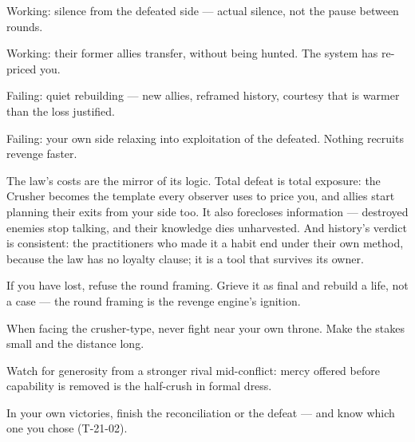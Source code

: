 \begin{feedback}
  \item Working: silence from the defeated side --- actual silence, not the pause between rounds.
  \item Working: their former allies transfer, without being hunted. The system has re-priced you.
  \item Failing: quiet rebuilding --- new allies, reframed history, courtesy that is warmer than the loss justified.
  \item Failing: your own side relaxing into exploitation of the defeated. Nothing recruits revenge faster.
\end{feedback}
\begin{failure}
The law's costs are the mirror of its logic. Total defeat is total exposure: the Crusher becomes the template every observer uses to price you, and allies start planning their exits from your side too. It also forecloses information --- destroyed enemies stop talking, and their knowledge dies unharvested. And history's verdict is consistent: the practitioners who made it a habit end under their own method, because the law has no loyalty clause; it is a tool that survives its owner.
\end{failure}
\begin{countermeasures}
  \item If you have lost, refuse the round framing. Grieve it as final and rebuild a life, not a case --- the round framing is the revenge engine's ignition.
  \item When facing the crusher-type, never fight near your own throne. Make the stakes small and the distance long.
  \item Watch for generosity from a stronger rival mid-conflict: mercy offered before capability is removed is the half-crush in formal dress.
  \item In your own victories, finish the reconciliation or the defeat --- and know which one you chose (T-21-02).
\end{countermeasures}

\seesources
{}

